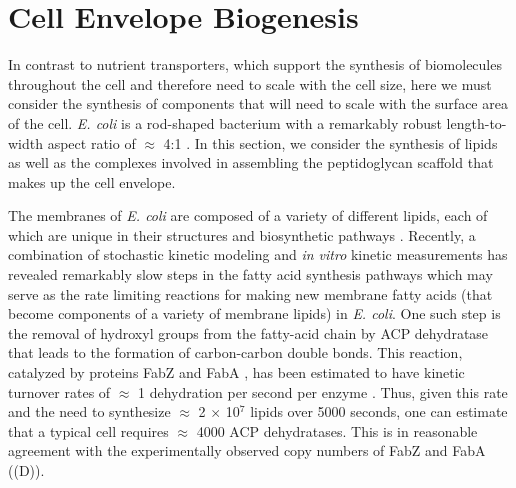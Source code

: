 \section{Cell Envelope Biogenesis}
In contrast to nutrient transporters, which support the synthesis of
biomolecules throughout the cell and therefore need to scale with the cell size,
here we must consider the synthesis of components that will need to scale with
the surface area of the cell. \textit{E. coli} is a rod-shaped bacterium with a
remarkably robust length-to-width aspect ratio of $\approx$ 4:1
\citep{harris2018, ojkic2019}. In this section, we consider the synthesis of
lipids as well as the complexes involved in assembling the peptidoglycan
scaffold that makes up the cell envelope.


The membranes of \textit{E. coli} are composed of a variety of different lipids,
each of which are unique in their structures and biosynthetic pathways
\citep{sohlenkamp2016}. Recently, a combination of stochastic kinetic modeling
\citep{ruppe2018} and \textit{in vitro} kinetic measurements
\citep{ranganathan2012, yu2011} has revealed remarkably slow steps in the fatty
acid synthesis pathways which may serve as the rate limiting reactions for
making new membrane fatty acids (that become components of a variety of
membrane lipids) in \textit{E. coli}. One such step is the removal of hydroxyl
groups from the fatty-acid chain by ACP dehydratase that leads to the formation
of carbon-carbon double bonds. This reaction, catalyzed by proteins FabZ and
FabA \citep{yu2011}, has been estimated to have kinetic
turnover rates of $\approx$ 1 dehydration per second per enzyme
\citep{ruppe2018}. Thus, given this rate and the need to synthesize $\approx$ 2
$\times$ 10$^7$ lipids over 5000 seconds, one can estimate that a typical cell
requires $\approx$ 4000 ACP dehydratases. This is in reasonable agreement with
the experimentally observed copy numbers of FabZ and FabA
((D)).

